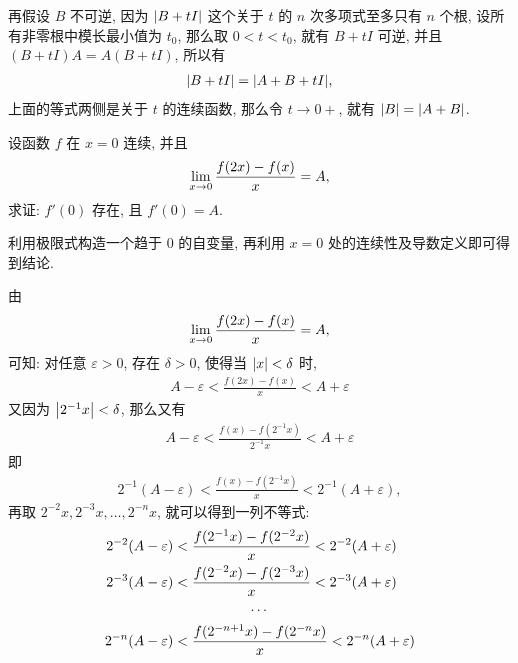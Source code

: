 \begin{exercise}[series=exer]
\begin{answer}
      再假设 $ B $ 不可逆, 因为 $ \abs{B + tI} $ 这个关于 $ t $ 的 $ n $ 次多项式至多只有 $ n $ 个根, 设所有非零根中模长最小值为 $ t_{0} $, 那么取 $ 0 < t < t_{0} $, 就有 $ B + tI $ 可逆, 并且 $ (B + tI)A = A(B + tI) $, 所以有
      \begin{align*}
          \abs{B + tI} = \abs{A + B + tI},
      \end{align*}
      上面的等式两侧是关于 $ t $ 的连续函数, 那么令 $ t \to 0+ $, 就有 $ \abs{B} = \abs{A + B} $.
  \end{answer}
  \item 设函数 $ f $ 在 $ x = 0 $ 连续, 并且
  \begin{align*}
      \lim_{x \to 0}\frac{f(2x) - f(x)}{x} = A,
  \end{align*}
  求证: $ f'(0) $ 存在, 且 $ f'(0) = A $.
  \begin{hint}
      利用极限式构造一个趋于 $ 0 $ 的自变量, 再利用 $ x = 0 $ 处的连续性及导数定义即可得到结论.
  \end{hint}
  \begin{answer}
      由
      \begin{align*}
          \lim_{x \to 0}\frac{f(2x) - f(x)}{x} = A,
      \end{align*}
      可知: 对任意 $ \varepsilon > 0 $, 存在 $ \delta > 0 $, 使得当 $ \abs{x} < \delta $ 时,
      \begin{align*}
          A - \varepsilon < \frac{f(2x) - f(x)}{x} < A + \varepsilon
      \end{align*}
      又因为 $ \abs{2^{-1}x} < \delta $, 那么又有
      \begin{align*}
          A - \varepsilon < \frac{f(x) - f(2^{-1}x)}{2^{-1}x} < A + \varepsilon
      \end{align*}
      即
      \begin{align*}
          2^{-1}(A - \varepsilon) < \frac{f(x) - f(2^{-1}x)}{x} < 2^{-1}(A + \varepsilon),
      \end{align*}
      再取 $ 2^{-2}x, 2^{-3}x, \dots, 2^{-n}x $, 就可以得到一列不等式:
      \begin{align}
          2^{-2}(A - \varepsilon) & < \frac{f(2^{-1}x) - f(2^{-2}x)}{x} < 2^{-2}(A + \varepsilon) \notag\\
          2^{-3}(A - \varepsilon) & < \frac{f(2^{-2}x) - f(2^{-3}x)}{x} < 2^{-3}(A + \varepsilon) \notag\\
                                            & \phantom{< f(2^{-2}x) -}\cdots \notag\\
          2^{-n}(A - \varepsilon) & < \frac{f(2^{-n + 1}x) - f(2^{-n}x)}{x} < 2^{-n}(A + \varepsilon) \notag\\

\end{align}
\end{answer}
\end{exercise}
